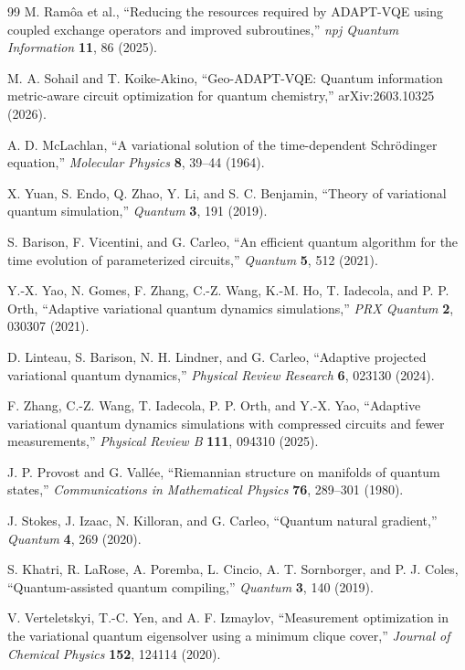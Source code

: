 \documentclass[
  reprint,
  amsmath,
  amssymb,
  aps,
  pra,
  nofootinbib,
  superscriptaddress,
  floatfix
]{revtex4-2}
\begin{document}
\begin{thebibliography}{99}
M. Ram\^oa et al.,
``Reducing the resources required by ADAPT-VQE using coupled exchange operators and improved subroutines,''
\emph{npj Quantum Information} \textbf{11}, 86 (2025).

M. A. Sohail and T. Koike-Akino,
``Geo-ADAPT-VQE: Quantum information metric-aware circuit optimization for quantum chemistry,''
arXiv:2603.10325 (2026).

A. D. McLachlan,
``A variational solution of the time-dependent Schr\"odinger equation,''
\emph{Molecular Physics} \textbf{8}, 39--44 (1964).

X. Yuan, S. Endo, Q. Zhao, Y. Li, and S. C. Benjamin,
``Theory of variational quantum simulation,''
\emph{Quantum} \textbf{3}, 191 (2019).

S. Barison, F. Vicentini, and G. Carleo,
``An efficient quantum algorithm for the time evolution of parameterized circuits,''
\emph{Quantum} \textbf{5}, 512 (2021).

Y.-X. Yao, N. Gomes, F. Zhang, C.-Z. Wang, K.-M. Ho, T. Iadecola, and P. P. Orth,
``Adaptive variational quantum dynamics simulations,''
\emph{PRX Quantum} \textbf{2}, 030307 (2021).

D. Linteau, S. Barison, N. H. Lindner, and G. Carleo,
``Adaptive projected variational quantum dynamics,''
\emph{Physical Review Research} \textbf{6}, 023130 (2024).

F. Zhang, C.-Z. Wang, T. Iadecola, P. P. Orth, and Y.-X. Yao,
``Adaptive variational quantum dynamics simulations with compressed circuits and fewer measurements,''
\emph{Physical Review B} \textbf{111}, 094310 (2025).

J. P. Provost and G. Vall\'ee,
``Riemannian structure on manifolds of quantum states,''
\emph{Communications in Mathematical Physics} \textbf{76}, 289--301 (1980).

J. Stokes, J. Izaac, N. Killoran, and G. Carleo,
``Quantum natural gradient,''
\emph{Quantum} \textbf{4}, 269 (2020).

S. Khatri, R. LaRose, A. Poremba, L. Cincio, A. T. Sornborger, and P. J. Coles,
``Quantum-assisted quantum compiling,''
\emph{Quantum} \textbf{3}, 140 (2019).

V. Verteletskyi, T.-C. Yen, and A. F. Izmaylov,
``Measurement optimization in the variational quantum eigensolver using a minimum clique cover,''
\emph{Journal of Chemical Physics} \textbf{152}, 124114 (2020).


\end{thebibliography}
\end{document}
